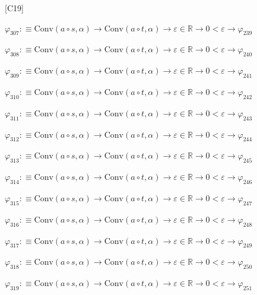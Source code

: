 \begin{fullproof}{[C19]}
\begin{abbrevlist}
\item $\varphi_{307} :\equiv \mathrm{Conv}(a \circ s,\alpha) \to \mathrm{Conv}(a \circ t,\alpha) \to \varepsilon \in \mathbb{R} \to 0 < \varepsilon \to \varphi_{239}$
\item $\varphi_{308} :\equiv \mathrm{Conv}(a \circ s,\alpha) \to \mathrm{Conv}(a \circ t,\alpha) \to \varepsilon \in \mathbb{R} \to 0 < \varepsilon \to \varphi_{240}$
\item $\varphi_{309} :\equiv \mathrm{Conv}(a \circ s,\alpha) \to \mathrm{Conv}(a \circ t,\alpha) \to \varepsilon \in \mathbb{R} \to 0 < \varepsilon \to \varphi_{241}$
\item $\varphi_{310} :\equiv \mathrm{Conv}(a \circ s,\alpha) \to \mathrm{Conv}(a \circ t,\alpha) \to \varepsilon \in \mathbb{R} \to 0 < \varepsilon \to \varphi_{242}$
\item $\varphi_{311} :\equiv \mathrm{Conv}(a \circ s,\alpha) \to \mathrm{Conv}(a \circ t,\alpha) \to \varepsilon \in \mathbb{R} \to 0 < \varepsilon \to \varphi_{243}$
\item $\varphi_{312} :\equiv \mathrm{Conv}(a \circ s,\alpha) \to \mathrm{Conv}(a \circ t,\alpha) \to \varepsilon \in \mathbb{R} \to 0 < \varepsilon \to \varphi_{244}$
\item $\varphi_{313} :\equiv \mathrm{Conv}(a \circ s,\alpha) \to \mathrm{Conv}(a \circ t,\alpha) \to \varepsilon \in \mathbb{R} \to 0 < \varepsilon \to \varphi_{245}$
\item $\varphi_{314} :\equiv \mathrm{Conv}(a \circ s,\alpha) \to \mathrm{Conv}(a \circ t,\alpha) \to \varepsilon \in \mathbb{R} \to 0 < \varepsilon \to \varphi_{246}$
\item $\varphi_{315} :\equiv \mathrm{Conv}(a \circ s,\alpha) \to \mathrm{Conv}(a \circ t,\alpha) \to \varepsilon \in \mathbb{R} \to 0 < \varepsilon \to \varphi_{247}$
\item $\varphi_{316} :\equiv \mathrm{Conv}(a \circ s,\alpha) \to \mathrm{Conv}(a \circ t,\alpha) \to \varepsilon \in \mathbb{R} \to 0 < \varepsilon \to \varphi_{248}$
\item $\varphi_{317} :\equiv \mathrm{Conv}(a \circ s,\alpha) \to \mathrm{Conv}(a \circ t,\alpha) \to \varepsilon \in \mathbb{R} \to 0 < \varepsilon \to \varphi_{249}$
\item $\varphi_{318} :\equiv \mathrm{Conv}(a \circ s,\alpha) \to \mathrm{Conv}(a \circ t,\alpha) \to \varepsilon \in \mathbb{R} \to 0 < \varepsilon \to \varphi_{250}$
\item $\varphi_{319} :\equiv \mathrm{Conv}(a \circ s,\alpha) \to \mathrm{Conv}(a \circ t,\alpha) \to \varepsilon \in \mathbb{R} \to 0 < \varepsilon \to \varphi_{251}$

\end{abbrevlist}
\end{fullproof}
